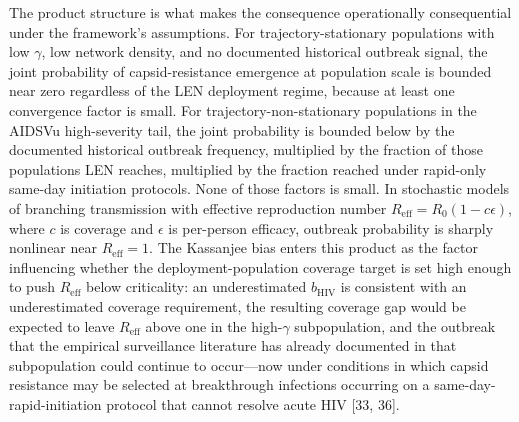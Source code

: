 \documentclass[12pt]{article}
\begin{document}
The product structure is what makes the consequence operationally consequential under the framework's assumptions. For trajectory-stationary populations with low $\gamma$, low network density, and no documented historical outbreak signal, the joint probability of capsid-resistance emergence at population scale is bounded near zero regardless of the LEN deployment regime, because at least one convergence factor is small. For trajectory-non-stationary populations in the AIDSVu high-severity tail, the joint probability is bounded below by the documented historical outbreak frequency, multiplied by the fraction of those populations LEN reaches, multiplied by the fraction reached under rapid-only same-day initiation protocols. None of those factors is small. In stochastic models of branching transmission with effective reproduction number $R_{\mathrm{eff}} = R_0(1 - c\epsilon)$, where $c$ is coverage and $\epsilon$ is per-person efficacy, outbreak probability is sharply nonlinear near $R_{\mathrm{eff}} = 1$. The Kassanjee bias enters this product as the factor influencing whether the deployment-population coverage target is set high enough to push $R_{\mathrm{eff}}$ below criticality: an underestimated $b_{\mathrm{HIV}}$ is consistent with an underestimated coverage requirement, the resulting coverage gap would be expected to leave $R_{\mathrm{eff}}$ above one in the high-$\gamma$ subpopulation, and the outbreak that the empirical surveillance literature has already documented in that subpopulation could continue to occur---now under conditions in which capsid resistance may be selected at breakthrough infections occurring on a same-day-rapid-initiation protocol that cannot resolve acute HIV [33, 36].
\end{document}
